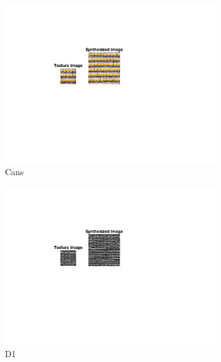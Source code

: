 \documentclass[10pt,twocolumn,letterpaper]{article}
\begin{document}
\begin{figure}
    \hfill
    \begin{subfigure}[h]{0.33\textwidth}
        \centering
        \includegraphics[trim={4.5cm 7cm 8.0cm 3cm}, clip, scale=1.5, width=\textwidth]{../results/syn_final/result_cans_B_80.png}
        \caption{Cans}
        \label{fig:cans_res}
    \end{subfigure}
    \begin{subfigure}[h]{0.33\textwidth}
        \centering
        \includegraphics[trim={4.5cm 7cm 8.0cm 3cm}, clip, scale=1.5, width=\textwidth]{../results/syn_final/result_brick_bw_B_40.png}
        \caption{D1}
        \label{fig:d1_res}
    \end{subfigure}
    \hfill
    \begin{subfigure}[h]{0.33\textwidth}

\end{subfigure}
\end{figure}
\end{document}
